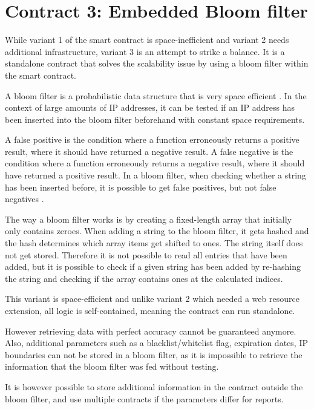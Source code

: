 \section{Contract 3: Embedded Bloom filter}

While variant 1 of the smart contract is space-inefficient and variant 2 needs additional infrastructure, variant 3 is an attempt to strike a balance. It is a standalone contract that solves the scalability issue by using a bloom filter within the smart contract.

A bloom filter is a probabilistic data structure that is very space efficient \cite{WikipediaBloomfilter}. In the context of large amounts of IP addresses, it can be tested if an IP address has been inserted into the bloom filter beforehand with constant space requirements.

A false positive is the condition where a function erroneously returns a positive result, where it should have returned a negative result. A false negative is the condition where a function erroneously returns a negative result, where it should have returned a positive result. In a bloom filter, when checking whether a string has been inserted before, it is possible to get false positives, but not false negatives \cite{WikipediaBloomfilter}.

The way a bloom filter works is by creating a fixed-length array that initially only contains zeroes. When adding a string to the bloom filter, it gets hashed and the hash determines which array items get shifted to ones. The string itself does not get stored. Therefore it is not possible to read all entries that have been added, but it is possible to check if a given string has been added by re-hashing the string and checking if the array contains ones at the calculated indices.

This variant is space-efficient and unlike variant 2 which needed a web resource extension, all logic is self-contained, meaning the contract can run standalone.

However retrieving data with perfect accuracy cannot be guaranteed anymore. Also, additional parameters such as a blacklist/whitelist flag, expiration dates, IP boundaries can not be stored in a bloom filter, as it is impossible to retrieve the information that the bloom filter was fed without testing.

It is however possible to store additional information in the contract outside the bloom filter, and use multiple contracts if the parameters differ for reports.

